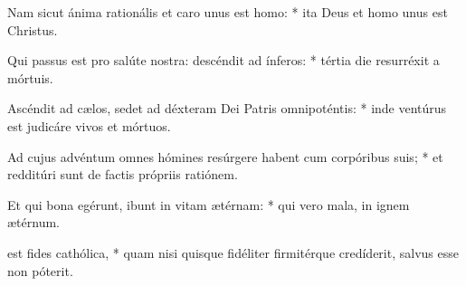 {Nam sicut ánima rationális et caro unus est homo: * ita Deus et homo unus est Christus.\par
Qui passus est pro salúte nostra: descéndit ad ínferos: * tértia die resurréxit a mórtuis.\par
Ascéndit ad c{\ae}los, sedet ad déxteram Dei Patris omnipoténtis: * inde ventúrus est judicáre vivos et mórtuos.\par
Ad cujus advéntum omnes hómines resúrgere habent cum corpóribus suis; * et redditúri sunt de factis própriis ratiónem.\par
Et qui bona egérunt, ibunt in vitam {\ae}térnam: * qui vero mala, in ignem {\ae}térnum.
\par
{} est fides cathólica, * quam nisi quisque fidéliter firmitérque credíderit, salvus esse non póterit.%
}
